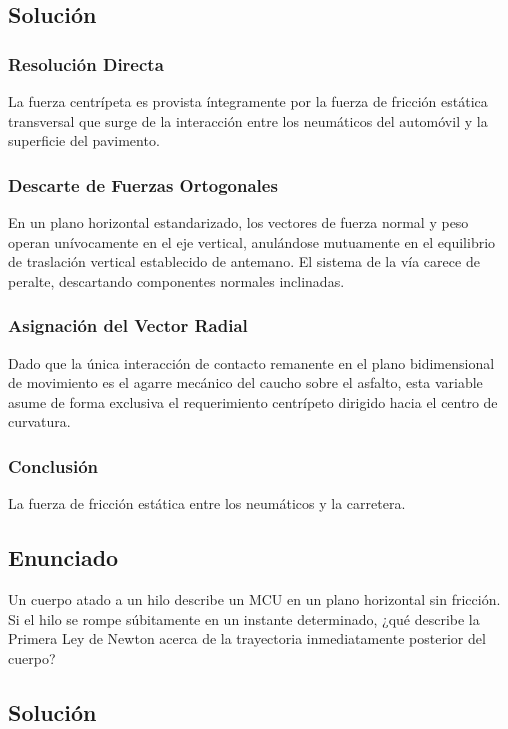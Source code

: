 \documentclass{article}
\begin{document}
\subsection*{Solución}

\subsubsection*{Resolución Directa}
La fuerza centrípeta es provista íntegramente por la fuerza de fricción estática transversal que surge de la interacción entre los neumáticos del automóvil y la superficie del pavimento.

\subsubsection*{Descarte de Fuerzas Ortogonales}
En un plano horizontal estandarizado, los vectores de fuerza normal y peso operan unívocamente en el eje vertical, anulándose mutuamente en el equilibrio de traslación vertical establecido de antemano. El sistema de la vía carece de peralte, descartando componentes normales inclinadas.

\subsubsection*{Asignación del Vector Radial}
Dado que la única interacción de contacto remanente en el plano bidimensional de movimiento es el agarre mecánico del caucho sobre el asfalto, esta variable asume de forma exclusiva el requerimiento centrípeto dirigido hacia el centro de curvatura.

\subsubsection*{Conclusión}
La fuerza de fricción estática entre los neumáticos y la carretera.

\newpage

\subsection*{Enunciado}
Un cuerpo atado a un hilo describe un MCU en un plano horizontal sin fricción. Si el hilo se rompe súbitamente en un instante determinado, ¿qué describe la Primera Ley de Newton acerca de la trayectoria inmediatamente posterior del cuerpo?

\subsection*{Solución}
\end{document}
